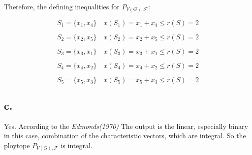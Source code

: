 \documentclass{article}
\begin{document}
{{        Therefore, the defining inequalities for \(\mathit{P}_{\mathit{V(G)},\mathcal{F}}\):

        \[\mathit{S}_{\mathrm{1}} = \{ \mathit{x}_{\mathrm{1}}, \mathit{x}_{\mathrm{4}}\} \quad \mathit{x}(\mathit{S}_{\mathrm{1}}) = \mathit{x}_{\mathrm{1}} + \mathit{x}_{\mathrm{4}} \leqslant \mathit{r(S)} = 2\]

        \[\mathit{S}_{\mathrm{2}} = \{ \mathit{x}_{\mathrm{2}}, \mathit{x}_{\mathrm{5}}\} \quad \mathit{x}(\mathit{S}_{\mathrm{2}}) = \mathit{x}_{\mathrm{2}} + \mathit{x}_{\mathrm{5}} \leqslant \mathit{r(S)} = 2\]

        \[\mathit{S}_{\mathrm{3}} = \{ \mathit{x}_{\mathrm{3}}, \mathit{x}_{\mathrm{1}}\} \quad \mathit{x}(\mathit{S}_{\mathrm{3}}) = \mathit{x}_{\mathrm{3}} + \mathit{x}_{\mathrm{1}} \leqslant \mathit{r(S)} = 2\]

        \[\mathit{S}_{\mathrm{4}} = \{ \mathit{x}_{\mathrm{4}}, \mathit{x}_{\mathrm{2}}\} \quad \mathit{x}(\mathit{S}_{\mathrm{4}}) = \mathit{x}_{\mathrm{4}} + \mathit{x}_{\mathrm{2}} \leqslant \mathit{r(S)} = 2\]

        \[\mathit{S}_{\mathrm{5}} = \{ \mathit{x}_{\mathrm{5}}, \mathit{x}_{\mathrm{3}}\} \quad \mathit{x}(\mathit{S}_{\mathrm{5}}) = \mathit{x}_{\mathrm{5}} + \mathit{x}_{\mathrm{3}} \leqslant \mathit{r(S)} = 2\]
    }
    \subsection*{c.}{
        Yes. According to the \textit{Edmonds(1970)} The output is the linear, especially binary in this case, combination of the characteristic vectors, which are integral. So the ploytope \(\mathit{P}_{\mathit{V(G)},\mathcal{F}}\) is integral.
    }
}
\end{document}
